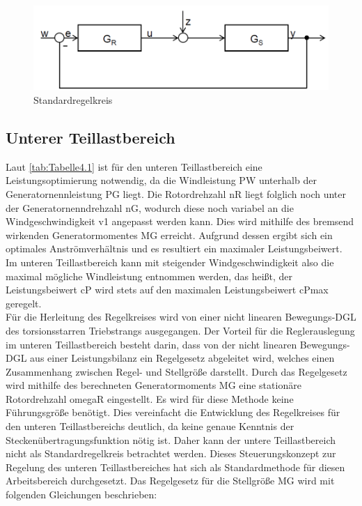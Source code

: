\begin{figure}[H]
    \centering
    \includegraphics[scale=0.45]{Bilder/Kapitel 6/Standardregelkreis.PNG}
    \caption{Standardregelkreis}
    \label{fig:Abbildung4.1}
\end{figure}

\subsection{Unterer Teillastbereich}

Laut \autoref{tab:Tabelle4.1} ist für den unteren Teillastbereich eine Leistungsoptimierung notwendig, da die Windleistung \acs{PW} unterhalb der Generatornennleistung \acs{PG} liegt. Die Rotordrehzahl \acs{nR} liegt folglich noch unter der Generatornenndrehzahl \acs{nG}, wodurch diese noch variabel an die Windgeschwindigkeit \acs{v1} angepasst werden kann. Dies wird mithilfe des bremsend wirkenden Generatormomentes \acs{MG} erreicht. Aufgrund dessen ergibt sich ein optimales Anströmverhältnis und es resultiert ein maximaler Leistungsbeiwert. Im unteren Teillastbereich kann mit steigender Windgeschwindigkeit also die maximal mögliche Windleistung entnommen werden, das heißt, der Leistungsbeiwert \acs{cP} wird stets auf den maximalen Leistungsbeiwert \acs{cPmax} geregelt.
\\
Für die Herleitung des Regelkreises wird von einer nicht linearen Bewegungs-DGL des torsionsstarren Triebstrangs ausgegangen. Der Vorteil für die Reglerauslegung im unteren Teillastbereich besteht darin, dass von der nicht linearen Bewegungs-DGL aus einer Leistungsbilanz ein Regelgesetz abgeleitet wird, welches einen Zusammenhang zwischen Regel- und Stellgröße darstellt. Durch das Regelgesetz wird mithilfe des berechneten Generatormoments \acs{MG} eine stationäre Rotordrehzahl \acs{omegaR} eingestellt. Es wird für diese Methode keine Führungsgröße benötigt. Dies vereinfacht die Entwicklung des Regelkreises für den unteren Teillastbereichs deutlich, da keine genaue Kenntnis der Steckenübertragungsfunktion nötig ist. Daher kann der untere Teillastbereich nicht als Standardregelkreis betrachtet werden. Dieses \glqq Steuerungskonzept\grqq{} zur Regelung des unteren Teillastbereiches hat sich als Standardmethode für diesen Arbeitsbereich durchgesetzt. Das Regelgesetz für die Stellgröße \acs{MG} wird mit folgenden Gleichungen beschrieben:
\newpage

